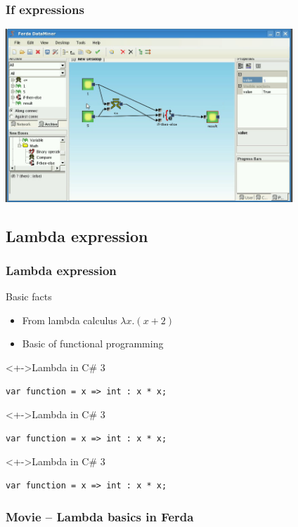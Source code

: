 \documentclass{beamer}
\begin{document}
\begin{frame}
	\frametitle{If expressions}
	\includegraphics[width=10.8cm]{ifthenelse2.png}
\end{frame}

\subsection{Lambda expression}
\begin{frame}[fragile]
	\frametitle{Lambda expression}
	\begin{block}{Basic facts}
		\begin{itemize}[<+->]
			\item From lambda calculus $\lambda x.(x+2)$
			\item Basic of functional programming
		\end{itemize}
	\end{block}
	\begin{block}<+->{Lambda in C\# 3}
\begin{verbatim}
var function = x => int : x * x;
\end{verbatim}
	\end{block}	
	\begin{block}<+->{Lambda in C\# 3}
\begin{verbatim}
var function = x => int : x * x;
\end{verbatim}
	\end{block}	
	\begin{block}<+->{Lambda in C\# 3}
\begin{verbatim}
var function = x => int : x * x;
\end{verbatim}
	\end{block}	
\end{frame}

\begin{frame}
	\frametitle{Movie -- Lambda basics in Ferda}
\end{frame}
\end{document}
